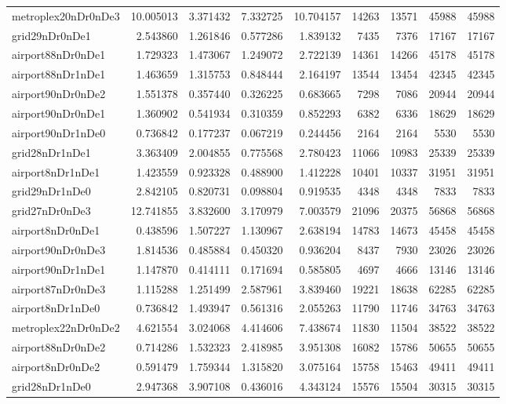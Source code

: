 \begin{longtable}{|l|r|r|r|r|r|r|r|r|}
metroplex20nDr0nDe3 & 10.005013 & 3.371432 & 7.332725 & 10.704157 & 14263 & 13571 & 45988 & 45988 \\
grid29nDr0nDe1 & 2.543860 & 1.261846 & 0.577286 & 1.839132 & 7435 & 7376 & 17167 & 17167 \\
airport88nDr0nDe1 & 1.729323 & 1.473067 & 1.249072 & 2.722139 & 14361 & 14266 & 45178 & 45178 \\
airport88nDr1nDe1 & 1.463659 & 1.315753 & 0.848444 & 2.164197 & 13544 & 13454 & 42345 & 42345 \\
airport90nDr0nDe2 & 1.551378 & 0.357440 & 0.326225 & 0.683665 & 7298 & 7086 & 20944 & 20944 \\
airport90nDr0nDe1 & 1.360902 & 0.541934 & 0.310359 & 0.852293 & 6382 & 6336 & 18629 & 18629 \\
airport90nDr1nDe0 & 0.736842 & 0.177237 & 0.067219 & 0.244456 & 2164 & 2164 & 5530 & 5530 \\
grid28nDr1nDe1 & 3.363409 & 2.004855 & 0.775568 & 2.780423 & 11066 & 10983 & 25339 & 25339 \\
airport8nDr1nDe1 & 1.423559 & 0.923328 & 0.488900 & 1.412228 & 10401 & 10337 & 31951 & 31951 \\
grid29nDr1nDe0 & 2.842105 & 0.820731 & 0.098804 & 0.919535 & 4348 & 4348 & 7833 & 7833 \\
grid27nDr0nDe3 & 12.741855 & 3.832600 & 3.170979 & 7.003579 & 21096 & 20375 & 56868 & 56868 \\
airport8nDr0nDe1 & 0.438596 & 1.507227 & 1.130967 & 2.638194 & 14783 & 14673 & 45458 & 45458 \\
airport90nDr0nDe3 & 1.814536 & 0.485884 & 0.450320 & 0.936204 & 8437 & 7930 & 23026 & 23026 \\
airport90nDr1nDe1 & 1.147870 & 0.414111 & 0.171694 & 0.585805 & 4697 & 4666 & 13146 & 13146 \\
airport87nDr0nDe3 & 1.115288 & 1.251499 & 2.587961 & 3.839460 & 19221 & 18638 & 62285 & 62285 \\
airport8nDr1nDe0 & 0.736842 & 1.493947 & 0.561316 & 2.055263 & 11790 & 11746 & 34763 & 34763 \\
metroplex22nDr0nDe2 & 4.621554 & 3.024068 & 4.414606 & 7.438674 & 11830 & 11504 & 38522 & 38522 \\
airport88nDr0nDe2 & 0.714286 & 1.532323 & 2.418985 & 3.951308 & 16082 & 15786 & 50655 & 50655 \\
airport8nDr0nDe2 & 0.591479 & 1.759344 & 1.315820 & 3.075164 & 15758 & 15463 & 49411 & 49411 \\
grid28nDr1nDe0 & 2.947368 & 3.907108 & 0.436016 & 4.343124 & 15576 & 15504 & 30315 & 30315 \\

\end{longtable}
